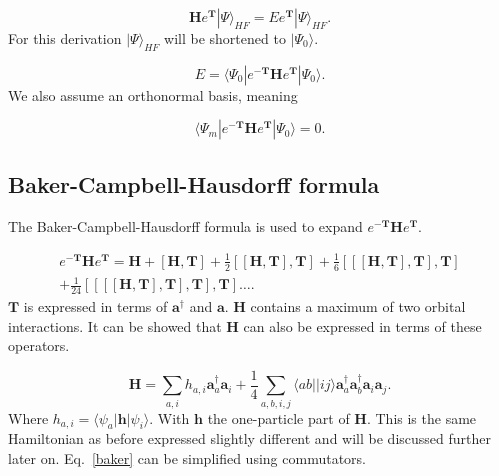 \documentclass[graybox,sectrefs,envcountresetchap,open=right]{svmonodo}
\begin{document}
\begin{equation}
\mathbf{H} e^{\mathbf{T}} |\Psi \rangle_{HF} = E e^{\mathbf{T}} |\Psi \rangle_{HF} .
\end{equation} 
For this derivation $|\Psi \rangle_{HF}$ will be shortened to $|\Psi_0 \rangle$. 

\begin{equation}
E = \langle \Psi_0 |e^{-\mathbf{T}} \mathbf{H} e^{\mathbf{T}} |\Psi_0 \rangle .
\end{equation} 
We also assume an orthonormal basis, meaning

\begin{equation}
\langle \Psi_m |e^{-\mathbf{T}} \mathbf{H} e^{\mathbf{T}} |\Psi_0 \rangle = 0 .
\end{equation} 

\subsection{Baker-Campbell-Hausdorff formula}
The Baker-Campbell-Hausdorff formula is used to expand $e^{-\mathbf{T}} \mathbf{H} e^{\mathbf{T}}$.

\begin{equation}
\begin{split}
e^{-\mathbf{T}} \mathbf{H} e^{\mathbf{T}} = 
\mathbf{H} 
+ \left[ \mathbf{H}, \mathbf{T} \right] 
+ \frac{1}{2} \left[ [\mathbf{H}, \mathbf{T}], \mathbf{T} \right]  + \frac{1}{6} \left[ [ [\mathbf{H}, \mathbf{T}], \mathbf{T}], \mathbf{T} \right] \\
+ \frac{1}{24} \left[ [ [ [\mathbf{H}, \mathbf{T}], \mathbf{T}],\mathbf{T}], \mathbf{T} \right] \dots .
\end{split}  \label{baker}
\end{equation} 
$\mathbf{T}$ is expressed in terms of $\mathbf{a}^{\dagger}$ and $\mathbf{a}$. $\mathbf{H}$ contains a maximum of two orbital interactions. It can be showed that $\mathbf{H}$ can also be expressed in terms of these operators. 

\begin{equation}
\mathbf{H} = \sum_{a,i} h_{a,i}
\mathbf{a}^{\dagger}_a 
\mathbf{a}_i 
+ \frac{1}{4} \sum_{a,b,i,j} \langle ab||ij \rangle
\mathbf{a}^{\dagger}_a  
\mathbf{a}^{\dagger}_b
\mathbf{a}_i 
\mathbf{a}_j . \label{annih}
\end{equation} 
Where $h_{a,i} = \langle \psi_a | \mathbf{h} | \psi_i \rangle$. With $\mathbf{h}$ the one-particle part of $\mathbf{H}$. This is the same Hamiltonian as before expressed slightly different and will be discussed further later on. Eq.~\ref{baker} can be simplified using commutators.
\end{document}
